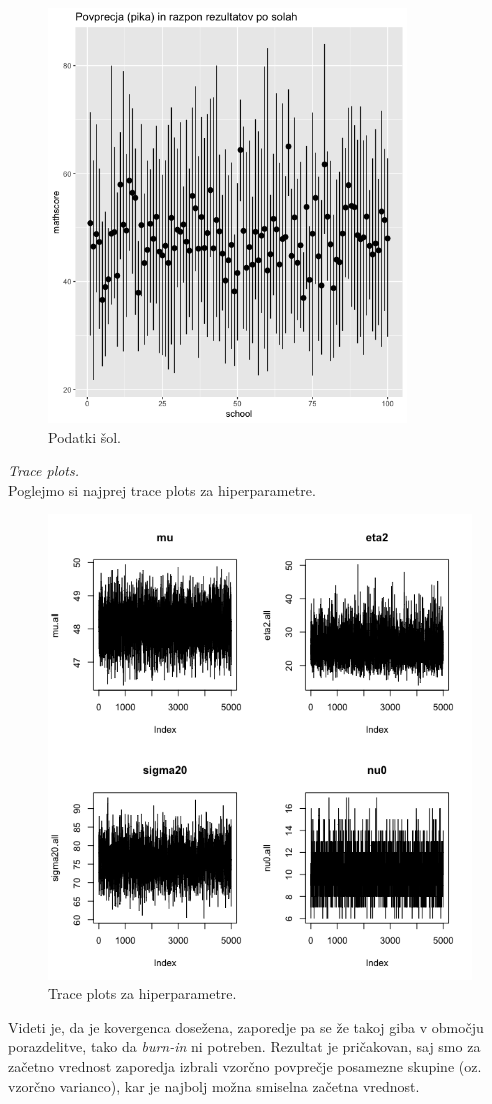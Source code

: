 \documentclass[a4paper,11pt]{article}
\begin{document}
\begin{figure}[ht!]
    \centering
    \includegraphics[width = 95mm]{Slike/naslovna.png}
    \caption{Podatki šol.}
\end{figure}
\noindent
\textit{Trace plots.}
\\
Poglejmo si najprej trace plots za hiperparametre.

\begin{figure}[ht!]
    \centering
    \includegraphics[width = 150mm]{Slike/2_hiper.png}
    \caption{Trace plots za hiperparametre.}
\end{figure}
\noindent
Videti je, da je kovergenca dosežena, zaporedje pa se že takoj giba v območju porazdelitve, tako da \textit{burn-in} ni potreben. 
Rezultat je pričakovan, saj smo za začetno vrednost zaporedja izbrali vzorčno povprečje posamezne skupine (oz. vzorčno varianco), kar je najbolj možna smiselna začetna vrednost.
\end{document}
